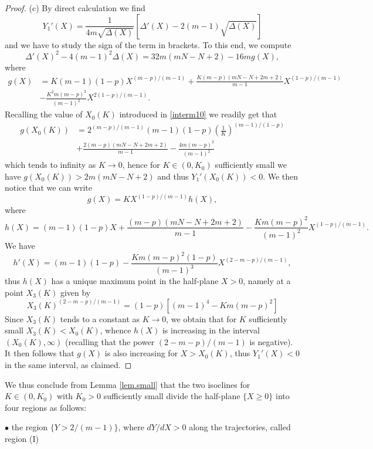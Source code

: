 \documentclass[a4paper,11pt]{article}
\numberwithin{equation}{section}
\begin{document}
\begin{proof}
\medskip

(c) By direct calculation we find
$$
Y_1'(X)=\frac{1}{4m\sqrt{\Delta(X)}}\left[\Delta'(X)-2(m-1)\sqrt{\Delta(X)}\right]
$$
and we have to study the sign of the term in brackets. To this end, we compute
\begin{equation*}
\Delta'(X)^2-4(m-1)^2\Delta(X)=32m(mN-N+2)-16mg(X),
\end{equation*}
where
\begin{equation*}
\begin{split}
g(X)&=K(m-1)(1-p)X^{(m-p)/(m-1)}+\frac{K(m-p)(mN-N+2m+2)}{m-1}X^{(1-p)/(m-1)}\\
&-\frac{K^2m(m-p)^2}{(m-1)^2}X^{2(1-p)/(m-1)}.
\end{split}
\end{equation*}
Recalling the value of $X_0(K)$ introduced in \eqref{interm10} we readily get that
\begin{equation*}
\begin{split}
g(X_0(K))&=2^{(m-p)/(m-1)}(m-1)(1-p)\left(\frac{1}{K}\right)^{(m-1)/(1-p)}\\
&+\frac{2(m-p)(mN-N+2m+2)}{m-1}-\frac{4m(m-p)^2}{(m-1)^2}
\end{split}
\end{equation*}
which tends to infinity as $K\to0$, hence for $K\in(0,K_0)$ sufficiently small we have $g(X_0(K))>2m(mN-N+2)$ and thus $Y_1'(X_0(K))<0$. We then notice that we can write
$$
g(X)=KX^{(1-p)/(m-1)}h(X),
$$
where
\begin{equation*}
h(X)=(m-1)(1-p)X+\frac{(m-p)(mN-N+2m+2)}{m-1}-\frac{Km(m-p)^2}{(m-1)^2}X^{(1-p)/(m-1)}.
\end{equation*}
We have
$$
h'(X)=(m-1)(1-p)-\frac{Km(m-p)^2(1-p)}{(m-1)^3}X^{(2-m-p)/(m-1)},
$$
thus $h(X)$ has a unique maximum point in the half-plane $X>0$, namely at a point $X_3(K)$ given by
$$
X_3(K)^{(2-m-p)/(m-1)}=(1-p)\left[(m-1)^4-Km(m-p)^2\right]
$$
Since $X_3(K)$ tends to a constant as $K\to0$, we obtain that for $K$ sufficiently small $X_3(K)<X_0(K)$, whence $h(X)$ is increasing in the interval $(X_0(K),\infty)$ (recalling that the power $(2-m-p)/(m-1)$ is negative). It then follows that $g(X)$ is also increasing for $X>X_0(K)$, thus $Y_1'(X)<0$ in the same interval, as claimed.
\end{proof}
We thus conclude from Lemma \ref{lem.small} that the two isoclines for $K\in(0,K_0)$ with $K_0>0$ sufficiently small divide the half-plane $\{X\geq0\}$ into four regions as follows:

$\bullet$ the region $\{Y>2/(m-1)\}$, where $dY/dX>0$ along the trajectories, called region (I)
\end{document}
